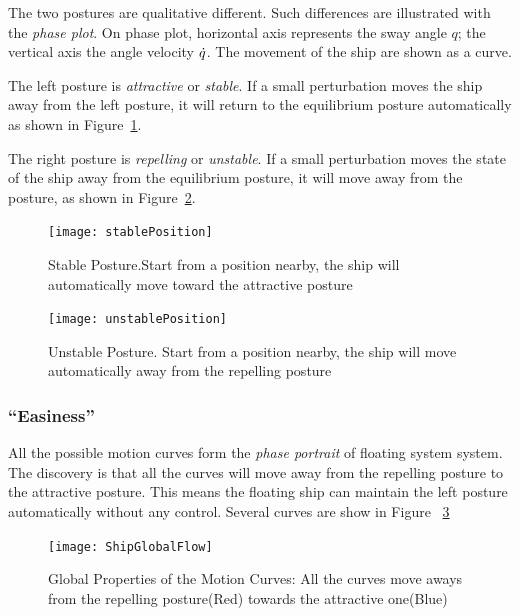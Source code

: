 The two postures are qualitative different. 
Such differences are illustrated with the \emph{phase plot}.
On phase plot, horizontal axis represents the sway angle $q$; the vertical  axis  the angle velocity $\dot{q}$. 
The movement of the ship are shown as a curve.

The left posture is \emph{attractive} or \emph{stable}.
If a small perturbation moves the ship away from the left posture, it will return to the equilibrium posture automatically as shown in Figure~\ref{fig:StablePosture}.

The right posture is \emph{repelling} or \emph{unstable}.
If a small perturbation moves the state of the ship away from the equilibrium posture, it will move away from the posture, as shown in Figure~\ref{fig:unStablePosture}.

 
\begin{figure}[!htbp]
  \begin{center}
      \texttt{[image: stablePosition]}
    \caption{Stable Posture.Start from a position nearby, the ship will automatically move toward the attractive posture}
    \label{fig:StablePosture}
  \end{center}
\end{figure}


\begin{figure}[!htbp]
  \begin{center}
      \texttt{[image: unstablePosition]}
    \caption{Unstable Posture. Start from a position nearby, the ship will move automatically away from the repelling posture}
    \label{fig:unStablePosture}
  \end{center}
\end{figure}


\subsubsection*{``Easiness''}
All the possible motion curves form the \emph{phase portrait} of floating system system. 
The discovery is that all the curves will move away from the repelling posture to the attractive posture.
This means the floating ship can maintain the left posture automatically without any control.
Several curves are show in Figure ~\ref{fig:globalflow}

\begin{figure}[!htbp]
  \begin{center}
   \texttt{[image: ShipGlobalFlow]}
   \caption{Global Properties of the Motion Curves: All the curves move aways from the repelling posture(Red) towards the attractive one(Blue)}
   \label{fig:globalflow}
  \end{center}
\end{figure}

